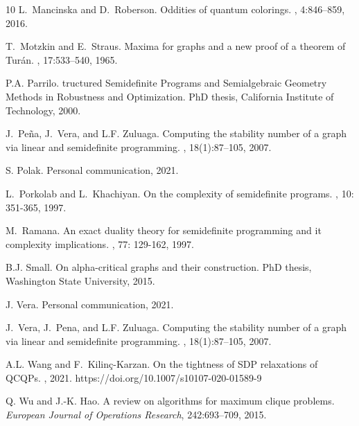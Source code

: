 \documentclass[11pt]{article}
\numberwithin{equation}{section}
\begin{document}
\begin{thebibliography}{10}
L.~Mancinska and D.~Roberson.
\newblock Oddities of quantum colorings.
, 4:846--859, 2016.

T.~Motzkin and E.~Straus.
\newblock Maxima for graphs and a new proof of a theorem of {T}ur{\'a}n.
, 17:533--540, 1965.


P.A. Parrilo.
tructured {S}emidefinite {P}rograms and {S}emialgebraic {G}eometry
  {M}ethods in {R}obustness and {O}ptimization.
\newblock PhD thesis, California Institute of Technology, 2000.

 J.~Pe\~{n}a, J.~Vera, and L.F. Zuluaga.
\newblock Computing the stability number of a graph via linear and semidefinite
  programming.
, 18(1):87--105, 2007.

S. Polak. Personal communication, 2021.

L.~Porkolab and L.~Khachiyan.
\newblock On the complexity of semidefinite programs.
, 10: 351-365, 1997.

M.~Ramana.
\newblock An exact duality theory for semidefinite programming and it complexity implications.
, 77: 129-162, 1997.

B.J. Small.
\newblock On alpha-critical graphs and their construction.
\newblock PhD thesis, Washington State University, 2015.


J. Vera. Personal communication, 2021.

J.~Vera, J.~Pena, and L.F. Zuluaga.
\newblock Computing the stability number of a graph via linear and semidefinite
  programming.
, 18(1):87--105, 2007.

A.L. Wang and F.~Kilin{\c{c}}-Karzan.
\newblock On the tightness of {SDP} relaxations of {QCQP}s.
, 2021. https://doi.org/10.1007/s10107-020-01589-9

Q. Wu and J.-K. Hao.
A review on algorithms for maximum clique problems.
{\em European Journal of Operations Research}, 242:693--709, 2015.



\end{thebibliography}
\end{document}
